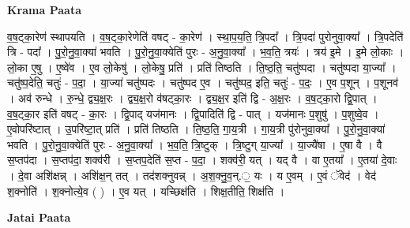 \documentclass[17pt]{extarticle}
\begin{document}
\textbf{Krama Paata} \newline

व॒ष॒ट्का॒रेण॑ स्थापयति । व॒ष॒ट्का॒रेणेति॑ वषट् - का॒रेण॑ । स्था॒प॒य॒ति॒ त्रि॒पदा᳚ । त्रि॒पदा॑ पुरोनुवा॒क्या᳚ । त्रि॒पदेति॑ त्रि - पदा᳚ । पु॒रो॒नु॒वा॒क्या॑ भवति । पु॒रो॒नु॒वा॒क्येति॑ पुरः - अ॒नु॒वा॒क्या᳚ । भ॒व॒ति॒ त्रयः॑ । त्रय॑ इ॒मे । इ॒मे लो॒काः । लो॒का ए॒षु । ए॒ष्वे॑व । ए॒व लो॒केषु॑ । लो॒केषु॒ प्रति॑ । प्रति॑ तिष्ठति । ति॒ष्ठ॒ति॒ चतु॑ष्पदा । चतु॑ष्पदा या॒ज्या᳚ । चतु॑ष्प॒देति॒ चतुः॑ - प॒दा॒ । या॒ज्या॑ चतु॑ष्पदः । चतु॑ष्पद ए॒व । चतु॑ष्पद॒ इति॒ चतुः॑ - प॒दः॒ । ए॒व प॒शून् । प॒शूनव॑ । अव॑ रुन्धे । रु॒न्धे॒ द्व्य॒क्ष॒रः । द्व्य॒क्ष॒रो व॑षट्का॒रः । द्व्य॒क्ष॒र इति॑ द्वि - अ॒क्ष॒रः । व॒ष॒ट्का॒रो द्वि॒पात् । व॒ष॒ट्का॒र इति॑ वषट् - का॒रः । द्वि॒पाद् यज॑मानः । द्वि॒पादिति॑ द्वि - पात् । यज॑मानः प॒शुषु॑ । प॒शुष्वे॒व । ए॒वोपरि॑ष्टात् । उ॒परि॑ष्टा॒त् प्रति॑ । प्रति॑ तिष्ठति । ति॒ष्ठ॒ति॒ गा॒य॒त्री । गा॒य॒त्री पु॑रोनुवा॒क्या᳚ । पु॒रो॒नु॒वा॒क्या॑ भवति । पु॒रो॒नु॒वा॒क्येति॑ पुरः - अ॒नु॒वा॒क्या᳚ । भ॒व॒ति॒ त्रि॒ष्टुक् । त्रि॒ष्टुग् या॒ज्या᳚ । या॒ज्यै॑षा । ए॒षा वै । वै स॒प्तप॑दा । स॒प्तप॑दा॒ शक्व॑री । स॒प्तप॒देति॑ स॒प्त - प॒दा॒ । शक्व॑री॒ यत् । यद् वै । वा ए॒तया᳚ । ए॒तया॑ दे॒वाः । दे॒वा अशि॑क्षन्न् । अशि॑क्ष॒न् तत् । तद॑शक्नुवन्न् । अ॒श॒क्नु॒व॒न्.॒ यः । य ए॒वम् । ए॒वं ॅवेद॑ । वेद॑ श॒क्नोति॑ । श॒क्नोत्ये॒व ( ) । ए॒व यत् । यच्छिक्ष॑ति । शिक्ष॒तीति॒ शिक्ष॑ति । \newline

\textbf{Jatai Paata} \newline
\end{document}
